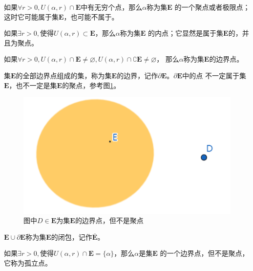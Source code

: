 \documentclass[lang=cn,10pt]{elegantbook}
\begin{document}
\begin{definition}[聚点]
	如果$\forall r >0,U(\alpha,r) \cap \mathbf{E}$中有无穷个点，那么$\alpha$称为集$\mathbf{E}$
	的一个聚点或者极限点；这时它可能属于集$\mathbf{E}$，也可能不属于。
\end{definition}

\begin{definition}[内点]
	如果$\exists r >0,$使得$U(\alpha,r) \subset \mathbf{E}$，那么$\alpha$称为集$\mathbf{E}$
	的内点；它显然是属于集$\mathbf{E}$的，并且为聚点。
\end{definition}

\begin{definition}[边界点]
	如果$\forall r >0,U(\alpha,r)\cap \mathbf{E}\neq\varnothing,U(\alpha,r)\cap\complement \mathbf{E}\neq\varnothing $，
	那么$\alpha$称为集$\mathbf{E}$的边界点。
\end{definition}

\begin{definition}[边界]
	集$\mathbf{E}$的全部边界点组成的集，称为集$\mathbf{E}$的边界，记作$\partial\mathbf{E}$。$\partial\mathbf{E}$中的点
	不一定属于集$\mathbf{E}$，也不一定是集$\mathbf{E}$的聚点，参考图\ref{imA_1}。
\end{definition}

\begin{figure}[h]
	\centering
	\includegraphics[scale = 0.6]{image/A_1.png}
	\caption{图中$D \in \mathbf{E}$为集$\mathbf{E}$的边界点，但不是聚点}
	\label{imA_1}
\end{figure}

\begin{definition}[闭包]
	$\mathbf{E}\cup\partial \mathbf{E}$称为集$\mathbf{E}$的闭包，记作$\mathbf{\overline E}$。
\end{definition}

\begin{definition}[孤立点]
	如果$\exists r >0,$使得$U(\alpha,r) \cap \mathbf{E} = \{\alpha\}$，那么$\alpha$是集$\mathbf{E}$
	的一个边界点，但不是聚点，它称为孤立点。
\end{definition}
\end{document}
